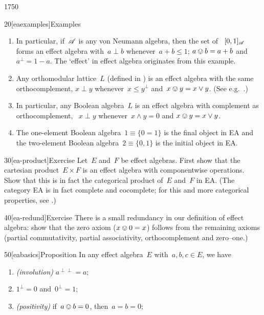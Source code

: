 \begin{parsec}{1750}
\begin{point}{20}[eaexamples]{Examples}
\begin{enumerate}
\item
In particular,
    if~$\mathscr{A}$ is any von Neumann algebra,
    then the set of ~$[0,1]_{\mathscr{A}}$
    forms an effect algebra
    with~$a \perp b$ whenever~$a +b \leq 1$;
    $a \ovee b = a + b$ and~$a^\perp = 1-a$.
The `effect' in effect algebra originates from this example.
\item
Any orthomodular lattice~$L$ (defined in )
    is an effect algebra
    with the same orthocomplement,
    $x \perp y$ whenever~$x \leq y^\perp$
    and~$x \ovee y = x \vee y$.  (See e.g.~\cite[prop.~27]{basmsc}.)
\item
In particular,
    any Boolean algebra~$L$
    is an effect algebra
    with complement as orthocomplement,
    ~$x \perp y$ whenever~$x \wedge y = 0$ and
    $x \ovee y = x \vee y $.
\item
The one-element Boolean algebra~$1 \equiv \{0=1\}$
    is the final object in \textsf{EA}
    and the two-element Boolean algebra~$2 \equiv \{0,1\}$
    is the initial object in \textsf{EA}.
\end{enumerate}
\spacingfix{}
\end{point}
\begin{point}{30}[ea-product]{Exercise}%
Let~$E$ and~$F$ be effect algebras.
First show that the cartesian product~$E \times F$
    is an effect algebra with componentwise operations.
Show that this is in fact the categorical product of~$E$ and~$F$
    in \textsf{EA}.
(The category \textsf{EA} is in fact complete and cocomplete;
    for this and more categorical properties,
        see \cite{corefl}.)
\end{point}
\begin{point}{40}[ea-redund]{Exercise}%
There is a small redundancy in our definition of effect algebra:
show that the zero axiom ($x \ovee 0 = x$)
follows from the remaining axioms (partial commutativity,
partial associativity, orthocomplement and zero--one.)
\end{point}
\begin{point}{50}[eabasics]{Proposition}%
In any effect algebra~$E$ with~$a,b,c\in E$, we have
\begin{enumerate}
    \item \emph{(involution)}
        $a^{\perp\perp} = a$;
    \item
        $1^\perp= 0$ and~$0^\perp = 1$;
    \item \emph{(positivity)}
        if~$a\ovee b = 0$, then~$a = b= 0$;

\end{enumerate}
\end{point}
\end{parsec}
